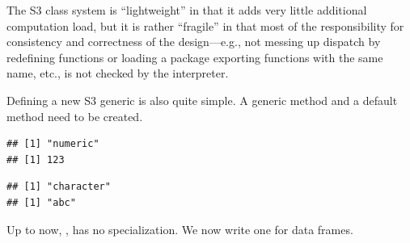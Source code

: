 \documentclass[krantz2]{krantz}\usepackage{knitr}
\begin{document}
\begin{explainbox}
 The S3 class system is ``lightweight'' in that it adds very little additional computation load, but it is rather ``fragile'' in that most of the responsibility for consistency and correctness of the design---e.g., not messing up dispatch by redefining functions or loading a package exporting functions with the same name, etc., is not checked by the \Rlang interpreter.

Defining a new S3 generic is also quite simple. A generic method and a default method need to be created.

\begin{knitrout}\footnotesize
{}\color{fgcolor}\begin{kframe}
\begin{alltt}
 \hlkwb{<-}  \hlstd{(}\hlstd{,} \hlstd{) \{}
   \hlstd{(}
 \hlstd{\}}

 \hlkwb{<-} \hlstd{(}\hlstd{,} \hlstd{) \{}
   \hlstd{(}
\hlstd{\}}
\end{alltt}
\end{kframe}
\end{knitrout}

\begin{knitrout}\footnotesize
{}\color{fgcolor}\begin{kframe}
\begin{alltt}
\hlstd{(}\hlstd{)}
\end{alltt}
\begin{verbatim}
## [1] "numeric"
## [1] 123
\end{verbatim}
\begin{alltt}
\hlstd{(}\hlstd{)}
\end{alltt}
\begin{verbatim}
## [1] "character"
## [1] "abc"
\end{verbatim}
\end{kframe}
\end{knitrout}

Up to now, , has no specialization. We now write one for data frames.

\begin{knitrout}\footnotesize
{}\color{fgcolor}\begin{kframe}
\begin{alltt}
 \hlkwb{<-} \hlstd{(}\hlstd{,}  \hlstd{=} \hlopt{:}\hlstd{,} \hlstd{) \{}
\hlstd{\}}
\end{alltt}
\end{kframe}
\end{knitrout}


\end{explainbox}
\end{document}
